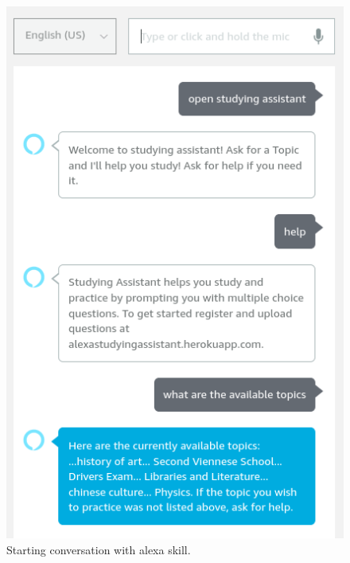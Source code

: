 \begin{figure}[!tbp]
  \centering
  \begin{minipage}[b]{0.4\textwidth}
    \includegraphics[width=\textwidth]{images/app/studying_assistant/start.png}
    \caption{Starting conversation with alexa skill.}
    \label{fig:start}
  \end{minipage}
  \hfill
  \begin{minipage}[b]{0.4\textwidth}

\end{minipage}
\end{figure}
